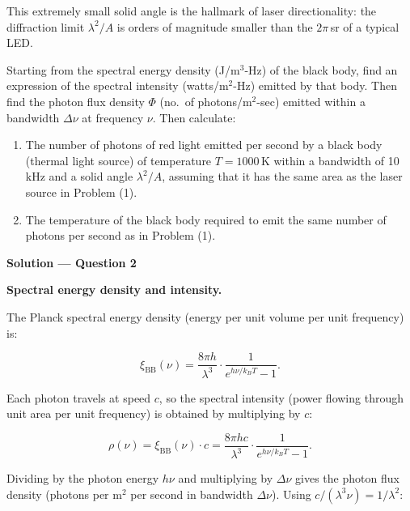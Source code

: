 This extremely small solid angle is the hallmark of laser directionality: the diffraction limit $\lambda^2/A$ is orders of magnitude smaller than the $2\pi$\,sr of a typical LED.


\begin{question}[Question 2]Starting from the spectral energy density (J/m$^{3}$-Hz) of the black
body, find an expression of the spectral intensity (watts/m$^{2}$-Hz) emitted by that body.
Then find the photon flux density $\Phi$ (no.\ of photons/m$^{2}$-sec) emitted within
a bandwidth $\Delta\nu$ at frequency $\nu$. Then calculate:

\begin{enumerate}[label=(\alph*)]
  \item The number of photons of red light emitted per second by a black body (thermal light
        source) of temperature $T=1000$\,K within a bandwidth of 10\,kHz and a solid angle
        $\lambda^{2}/A$, assuming that it has the same area as the laser source in Problem (1).
  \item The temperature of the black body required to emit the same number of photons per
        second as in Problem (1).
\end{enumerate}
\end{question}

\textbf{\large Solution --- Question 2}

\textbf{Spectral energy density and intensity.}

The Planck spectral energy density (energy per unit volume per unit frequency) is:

\begin{equation*}
  \xi_\text{BB}(\nu) = \frac{8\pi h}{\lambda^{3}}\cdot\frac{1}{e^{h\nu/k_BT}-1}.
\end{equation*}

Each photon travels at speed $c$, so the spectral intensity (power flowing through unit area per unit frequency) is obtained by multiplying by $c$:

\begin{equation*}
  \rho(\nu) = \xi_\text{BB}(\nu)\cdot c = \frac{8\pi hc}{\lambda^{3}}\cdot\frac{1}{e^{h\nu/k_BT}-1}.
\end{equation*}

Dividing by the photon energy $h\nu$ and multiplying by $\Delta\nu$ gives the photon flux density (photons per m$^{2}$ per second in bandwidth $\Delta\nu$). Using $c/(\lambda^{3}\nu) = 1/\lambda^{2}$:

